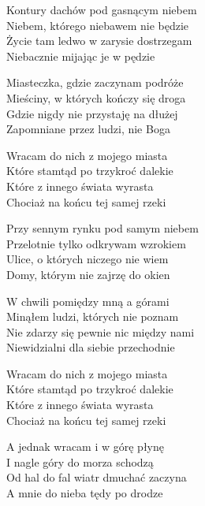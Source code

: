 \begin{text}
    \hfill\break
    \hfill\break
    Kontury dachów pod gasnącym niebem\\
    Niebem, którego niebawem nie będzie\\
    Życie tam ledwo w zarysie dostrzegam\\
    Niebacznie mijając je w pędzie

    Miasteczka, gdzie zaczynam podróże\\
    Mieściny, w których kończy się droga\\
    Gdzie nigdy nie przystaję na dłużej\\
    Zapomniane przez ludzi, nie Boga

    \vin Wracam do nich z mojego miasta\\
    \vin Które stamtąd po trzykroć dalekie\\
    \vin Które z innego świata wyrasta\\
    \vin Chociaż na końcu tej samej rzeki

    Przy sennym rynku pod samym niebem\\
    Przelotnie tylko odkrywam wzrokiem\\
    Ulice, o których niczego nie wiem\\
    Domy, którym nie zajrzę do okien

    W chwili pomiędzy mną a górami\\
    Minąłem ludzi, których nie poznam\\
    Nie zdarzy się pewnie nic między nami\\
    Niewidzialni dla siebie przechodnie

    \vin Wracam do nich z mojego miasta\\
    \vin Które stamtąd po trzykroć dalekie\\
    \vin Które z innego świata wyrasta\\
    \vin Chociaż na końcu tej samej rzeki

    \vin A jednak wracam i w górę płynę\\
    \vin I nagle góry do morza schodzą\\
    \vin Od hal do fal wiatr dmuchać zaczyna\\
    \vin A mnie do nieba tędy po drodze
\end{text}
